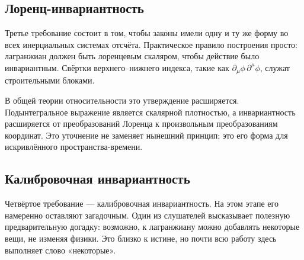 \subsection{Лоренц-инвариантность}

Третье требование состоит в том, чтобы законы имели одну и ту же форму во всех инерциальных системах отсчёта. Практическое правило построения просто: лагранжиан должен быть лоренцевым скаляром, чтобы действие было инвариантным. Свёртки верхнего--нижнего индекса, такие как \(\partial_\mu\phi\,\partial^\mu\phi\), служат строительными блоками.

В общей теории относительности это утверждение расширяется. Подынтегральное выражение является скалярной плотностью, а инвариантность расширяется от преобразований Лоренца к произвольным преобразованиям координат. Это уточнение не заменяет нынешний принцип; это его форма для искривлённого пространства-времени.

\begin{classroomqa}
\end{classroomqa}

\begin{classroomqa}
\end{classroomqa}

\subsection{Калибровочная инвариантность}

Четвёртое требование — калибровочная инвариантность. На этом этапе его намеренно оставляют загадочным. Один из слушателей высказывает полезную предварительную догадку: возможно, к лагранжиану можно добавлять некоторые вещи, не изменяя физики. Это близко к истине, но почти всю работу здесь выполняет слово «некоторые».

